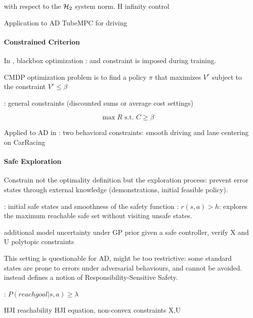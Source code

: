 \citep{Berkenkamp2015} with respect to the $\mathcal{H}_2$ system norm.
H infinity control

Application to AD
\citep{Williams2018} TubeMPC for driving

\paragraph{Constrained Criterion}

In \citep{Berkenkamp2016}, blackbox optimization : and constraint is imposed during training.

CMDP optimization problem is to find a policy $\pi$ that maximizes $V^r$ subject to the constraint $V^c \leq \beta$

\citep{Altman1999,Achiam2017}

\citep{Tessler2019}: general constraints (discounted sums or average cost settings)

$$\max R \text{ s.t. } C \geq \beta$$

Applied to AD in \citep{Le2019}: two behavioral constraints: smooth driving and lane centering on CarRacing


\paragraph{Safe Exploration}

Constrain not the optimality definition but the exploration process: prevent error states through external knowledge (demonstrations, initial feasible policy).

\citep{Turchetta2016}: initial safe states and smoothness of the safety function : $r(s,a) > h$: explores the maximum reachable safe set without visiting unsafe states.

\citep{Koller2019}
additional model uncertainty under GP prior
given a safe controller, verify X and U polytopic constraints


This setting is questionable for AD, might be too restrictive: some standard states are prone to errors under adversarial behaviours, and cannot be avoided.
\citep{ShalevShwartz2017} instead defines a notion of Responsibility-Sensitive Safety.

\citep{Bouton2019}
\citep{Bouton2019workshop}: $P(reach goal |s, a) \geq \lambda$

\citep{leung2018infusing} HJI reachability
\citep{Fisac2019} HJI equation, non-convex constraints X,U
